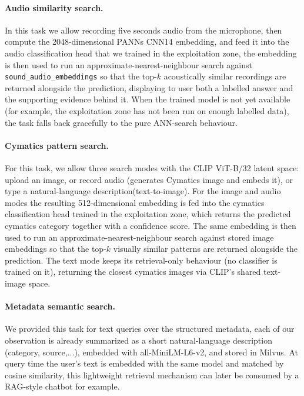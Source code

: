 \documentclass[11pt,a4paper]{article}
\begin{document}
\paragraph{Audio similarity search.} In this task we allow recording five seconds audio from the microphone, then compute the 2048-dimensional PANNs CNN14 embedding, and feed it into the audio classification head that we trained in the exploitation zone, the embedding is then used to run an approximate-nearest-neighbour search against \texttt{sound\_audio\_embeddings} so that the top-$k$ acoustically similar recordings are returned alongside the prediction, displaying to user both a labelled answer and the supporting evidence behind it. When the trained model is not yet available (for example, the exploitation zone has not been run on enough labelled data), the task falls back gracefully to the pure ANN-search behaviour.

\paragraph{Cymatics pattern search.} For this task, we allow three search modes with the CLIP ViT-B/32 latent space: upload an image, or record audio (generates Cymatics image and embeds it), or type a natural-language description(text-to-image). For the image and audio modes the resulting 512-dimensional embedding is fed into the cymatics classification head trained in the exploitation zone, which returns the predicted cymatics category together with a confidence score. The same embedding is then used to run an approximate-nearest-neighbour search against stored image embeddings so that the top-$k$ visually similar patterns are returned alongside the prediction. The text mode keeps its retrieval-only behaviour (no classifier is trained on it), returning the closest cymatics images via CLIP's shared text-image space.

\paragraph{Metadata semantic search.}  We provided this task for text queries over the structured metadata, each of our observation is already summarized as a short natural-language description (category, source,...), embedded with all-MiniLM-L6-v2, and stored in Milvus. At query time the user's text is embedded with the same model and matched by cosine similarity, this lightweight retrieval mechanism can later be consumed by a RAG-style chatbot for example.
\end{document}
